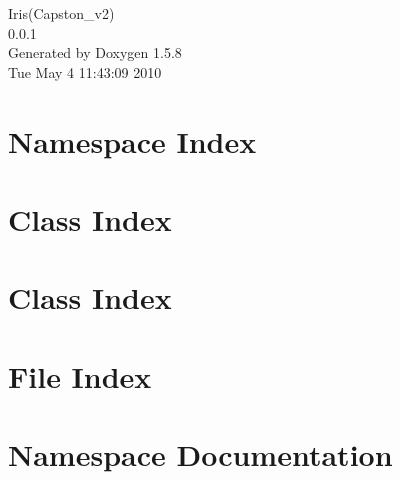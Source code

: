 \documentclass[a4paper]{book}
\begin{document}
\begin{titlepage}
\vspace*{7cm}
\begin{center}
{\Large Iris(Capston\_\-v2) \\[1ex]\large 0.0.1 }\\
\vspace*{1cm}
{\large Generated by Doxygen 1.5.8}\\
\vspace*{0.5cm}
{\small Tue May 4 11:43:09 2010}\\
\end{center}
\end{titlepage}
\clearemptydoublepage
{}
\tableofcontents
\clearemptydoublepage
{}
\chapter{Namespace Index}

\chapter{Class Index}

\chapter{Class Index}

\chapter{File Index}

\chapter{Namespace Documentation}

\end{document}
